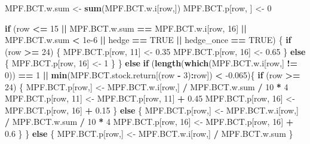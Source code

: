 \documentclass[
]{article}
\newenvironment{Shaded}{\begin{snugshade}}{\end{snugshade}}
\newcommand{\ControlFlowTok}[1]{\textcolor[rgb]{0.13,0.29,0.53}{\textbf{#1}}}
\newcommand{\DecValTok}[1]{\textcolor[rgb]{0.00,0.00,0.81}{#1}}
\newcommand{\FloatTok}[1]{\textcolor[rgb]{0.00,0.00,0.81}{#1}}
\newcommand{\KeywordTok}[1]{\textcolor[rgb]{0.13,0.29,0.53}{\textbf{#1}}}
\newcommand{\NormalTok}[1]{#1}
\newcommand{\OperatorTok}[1]{\textcolor[rgb]{0.81,0.36,0.00}{\textbf{#1}}}
\newcommand{\OtherTok}[1]{\textcolor[rgb]{0.56,0.35,0.01}{#1}}
\newcommand{\StringTok}[1]{\textcolor[rgb]{0.31,0.60,0.02}{#1}}
\begin{document}
\begin{Shaded}
\begin{Highlighting}[]
{\NormalTok{    MPF.BCT.w.sum <-}\StringTok{ }\KeywordTok{sum}\NormalTok{(MPF.BCT.w.i[row,])}
\NormalTok{    MPF.BCT.p[row, ] <-}\StringTok{ }\DecValTok{0}

    \ControlFlowTok{if}\NormalTok{ (row }\OperatorTok{<=}\StringTok{ }\DecValTok{15} \OperatorTok{||}\StringTok{ }\NormalTok{MPF.BCT.w.sum }\OperatorTok{==}\StringTok{ }\NormalTok{MPF.BCT.w.i[row, }\DecValTok{16}\NormalTok{] }\OperatorTok{||}
\StringTok{        }\NormalTok{MPF.BCT.w.sum }\OperatorTok{<}\StringTok{ }\FloatTok{1e-6} \OperatorTok{||}\StringTok{ }\NormalTok{hedge }\OperatorTok{==}\StringTok{ }\OtherTok{TRUE} \OperatorTok{||}\StringTok{ }\NormalTok{hedge_once }\OperatorTok{==}\StringTok{ }\OtherTok{TRUE}\NormalTok{) \{}
      \ControlFlowTok{if}\NormalTok{ (row }\OperatorTok{>=}\StringTok{ }\DecValTok{24}\NormalTok{) \{}
\NormalTok{        MPF.BCT.p[row, }\DecValTok{11}\NormalTok{] <-}\StringTok{ }\FloatTok{0.35}
\NormalTok{        MPF.BCT.p[row, }\DecValTok{16}\NormalTok{] <-}\StringTok{ }\FloatTok{0.65}
\NormalTok{      \} }\ControlFlowTok{else}\NormalTok{ \{}
\NormalTok{        MPF.BCT.p[row, }\DecValTok{16}\NormalTok{] <-}\StringTok{ }\DecValTok{1}
\NormalTok{      \}}
\NormalTok{    \} }\ControlFlowTok{else} \ControlFlowTok{if}\NormalTok{ (}\KeywordTok{length}\NormalTok{(}\KeywordTok{which}\NormalTok{(MPF.BCT.w.i[row,] }\OperatorTok{!=}\StringTok{ }\DecValTok{0}\NormalTok{)) }\OperatorTok{==}\StringTok{ }\DecValTok{1} \OperatorTok{||}
\StringTok{               }\KeywordTok{min}\NormalTok{(MPF.BCT.stock.return[(row }\OperatorTok{-}\StringTok{ }\DecValTok{3}\NormalTok{)}\OperatorTok{:}\NormalTok{row]) }\OperatorTok{<}\StringTok{ }\FloatTok{-0.065}\NormalTok{)\{}
      \ControlFlowTok{if}\NormalTok{ (row }\OperatorTok{>=}\StringTok{ }\DecValTok{24}\NormalTok{) \{}
\NormalTok{        MPF.BCT.p[row,] <-}\StringTok{ }\NormalTok{MPF.BCT.w.i[row,] }\OperatorTok{/}\StringTok{ }\NormalTok{MPF.BCT.w.sum }\OperatorTok{/}\StringTok{ }\DecValTok{10} \OperatorTok{*}\StringTok{ }\DecValTok{4}
\NormalTok{        MPF.BCT.p[row, }\DecValTok{11}\NormalTok{] <-}\StringTok{ }\NormalTok{MPF.BCT.p[row, }\DecValTok{11}\NormalTok{] }\OperatorTok{+}\StringTok{ }\FloatTok{0.45}
\NormalTok{        MPF.BCT.p[row, }\DecValTok{16}\NormalTok{] <-}\StringTok{ }\NormalTok{MPF.BCT.p[row, }\DecValTok{16}\NormalTok{] }\OperatorTok{+}\StringTok{ }\FloatTok{0.15}
\NormalTok{      \} }\ControlFlowTok{else}\NormalTok{ \{}
\NormalTok{        MPF.BCT.p[row,] <-}\StringTok{ }\NormalTok{MPF.BCT.w.i[row,] }\OperatorTok{/}\StringTok{ }\NormalTok{MPF.BCT.w.sum }\OperatorTok{/}\StringTok{ }\DecValTok{10} \OperatorTok{*}\StringTok{ }\DecValTok{4}
\NormalTok{        MPF.BCT.p[row, }\DecValTok{16}\NormalTok{] <-}\StringTok{ }\NormalTok{MPF.BCT.p[row, }\DecValTok{16}\NormalTok{] }\OperatorTok{+}\StringTok{ }\FloatTok{0.6}
\NormalTok{      \}}
\NormalTok{    \} }\ControlFlowTok{else}\NormalTok{ \{}
\NormalTok{      MPF.BCT.p[row,] <-}\StringTok{ }\NormalTok{MPF.BCT.w.i[row,] }\OperatorTok{/}\StringTok{ }\NormalTok{MPF.BCT.w.sum}
\NormalTok{    \} }

}
\end{Highlighting}
\end{Shaded}
\end{document}
